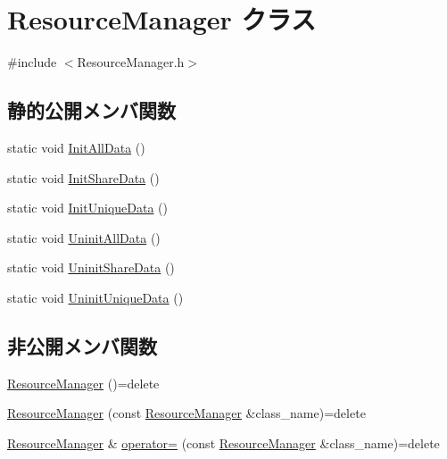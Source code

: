\hypertarget{class_resource_manager}{}\section{Resource\+Manager クラス}
\label{class_resource_manager}


{\ttfamily \#include $<$Resource\+Manager.\+h$>$}

\subsection*{静的公開メンバ関数}
\begin{DoxyCompactItemize}
\item 
static void \mbox{\hyperlink{class_resource_manager_aa91dc794c10825768c5d85e69342632b}{Init\+All\+Data}} ()
\item 
static void \mbox{\hyperlink{class_resource_manager_af9be166f96250b01b9070a262cdb5d34}{Init\+Share\+Data}} ()
\item 
static void \mbox{\hyperlink{class_resource_manager_ab1ea00fb7eb4006bb9cbb48612da2c79}{Init\+Unique\+Data}} ()
\item 
static void \mbox{\hyperlink{class_resource_manager_a8d96f0a74a92212e8b2948467bb3cac7}{Uninit\+All\+Data}} ()
\item 
static void \mbox{\hyperlink{class_resource_manager_a786915d9c4df5a023a43db8c5332cb93}{Uninit\+Share\+Data}} ()
\item 
static void \mbox{\hyperlink{class_resource_manager_abcb135906cb991a49ec6e8c8db057de1}{Uninit\+Unique\+Data}} ()
\end{DoxyCompactItemize}
\subsection*{非公開メンバ関数}
\begin{DoxyCompactItemize}
\item 
\mbox{\hyperlink{class_resource_manager_aef25bb48c1ff96b8179c9f9cbb547831}{Resource\+Manager}} ()=delete
\item 
\mbox{\hyperlink{class_resource_manager_a977c29f32d3d775f9079e35b9c3bf733}{Resource\+Manager}} (const \mbox{\hyperlink{class_resource_manager}{Resource\+Manager}} \&class\+\_\+name)=delete
\item 
\mbox{\hyperlink{class_resource_manager}{Resource\+Manager}} \& \mbox{\hyperlink{class_resource_manager_a9c420ee8ffde51a27fe6ca37229ffa83}{operator=}} (const \mbox{\hyperlink{class_resource_manager}{Resource\+Manager}} \&class\+\_\+name)=delete
\end{DoxyCompactItemize}


